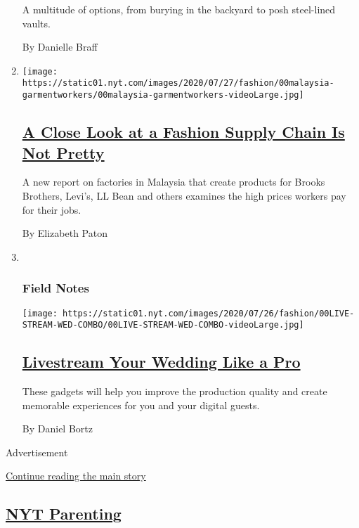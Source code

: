 \begin{enumerate}
  A multitude of options, from burying in the backyard to posh
  steel-lined vaults.

  By Danielle Braff
\item
  \texttt{[image: https://static01.nyt.com/images/2020/07/27/fashion/00malaysia-garmentworkers/00malaysia-garmentworkers-videoLarge.jpg]}

  \hypertarget{a-close-look-at-a-fashion-supply-chain-is-not-pretty}{%
  \subsection{\texorpdfstring{\href{/2020/07/28/style/malaysia-forced-labor-garment-workers.html}{A
  Close Look at a Fashion Supply Chain Is Not
  Pretty}}{A Close Look at a Fashion Supply Chain Is Not Pretty}}\label{a-close-look-at-a-fashion-supply-chain-is-not-pretty}}

  A new report on factories in Malaysia that create products for Brooks
  Brothers, Levi's, LL Bean and others examines the high prices workers
  pay for their jobs.

  By Elizabeth Paton
\item ~
  \hypertarget{field-notes}{%
  \subsubsection{Field Notes}\label{field-notes}}

  \texttt{[image: https://static01.nyt.com/images/2020/07/26/fashion/00LIVE-STREAM-WED-COMBO/00LIVE-STREAM-WED-COMBO-videoLarge.jpg]}

  \hypertarget{livestream-your-wedding-like-a-pro}{%
  \subsection{\texorpdfstring{\href{/2020/07/28/fashion/weddings/livestream-your-wedding-like-a-pro.html}{Livestream
  Your Wedding Like a
  Pro}}{Livestream Your Wedding Like a Pro}}\label{livestream-your-wedding-like-a-pro}}

  These gadgets will help you improve the production quality and create
  memorable experiences for you and your digital guests.

  By Daniel Bortz
\end{enumerate}

Advertisement

\protect\hyperlink{after-mid1}{Continue reading the main story}

\hypertarget{nyt-parenting}{%
\subsection{\texorpdfstring{\href{/spotlight/parenting}{NYT
Parenting}}{NYT Parenting}}\label{nyt-parenting}}

